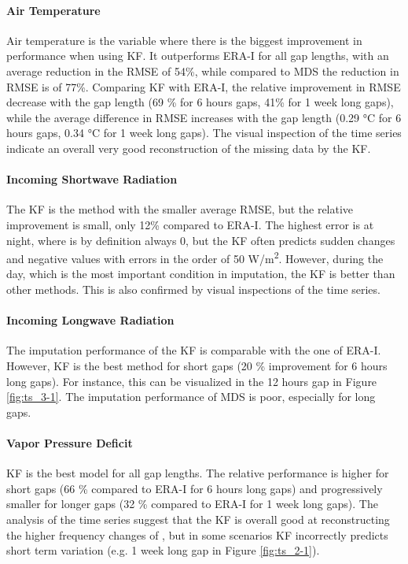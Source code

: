 \documentclass{article}
\begin{document}

\paragraph{Air Temperature} Air temperature is the variable where there is the biggest improvement in performance when using KF. It outperforms ERA-I for all gap lengths, with an average reduction in the RMSE of 54\%, while compared to MDS the reduction in RMSE is of 77\%. Comparing KF with ERA-I, the relative improvement in RMSE decrease with the gap length (69 \% for 6 hours gaps, 41\% for 1 week long gaps), while the average difference in RMSE increases with the gap length (0.29 °C  for 6 hours gaps, 0.34 °C for 1 week long gaps).
The visual inspection of the time series indicate an overall very good reconstruction of the missing data by the KF.

\paragraph{Incoming Shortwave Radiation} The KF is the method with the smaller average RMSE, but the relative improvement is small, only 12\% compared to ERA-I. The highest error is at night, where  is by definition always 0, but the KF often predicts sudden changes and negative values with errors in the order of 50 \si{W/m^2}. However, during the day, which is the most important condition in  imputation, the KF is better than other methods. This is also confirmed by visual inspections of the time series.

\paragraph{Incoming Longwave Radiation} The imputation performance of the KF is comparable with the one of ERA-I. However, KF is the best method for short gaps (20 \% improvement for 6 hours long gaps). For instance, this can be visualized in the 12 hours gap in Figure \ref{fig:ts_3-1}. The imputation performance of MDS is poor, especially for long gaps.

\paragraph{Vapor Pressure Deficit} KF is the best model for all gap lengths. The relative performance is higher for short gaps (66 \% compared to ERA-I for 6 hours long gaps) and progressively smaller for longer gaps (32 \% compared to ERA-I for 1 week long gaps). The analysis of the time series suggest that the KF is overall good at reconstructing the higher frequency changes of , but in some scenarios KF incorrectly predicts short term variation (e.g. 1 week long gap in Figure \ref{fig:ts_2-1}).
\end{document}
